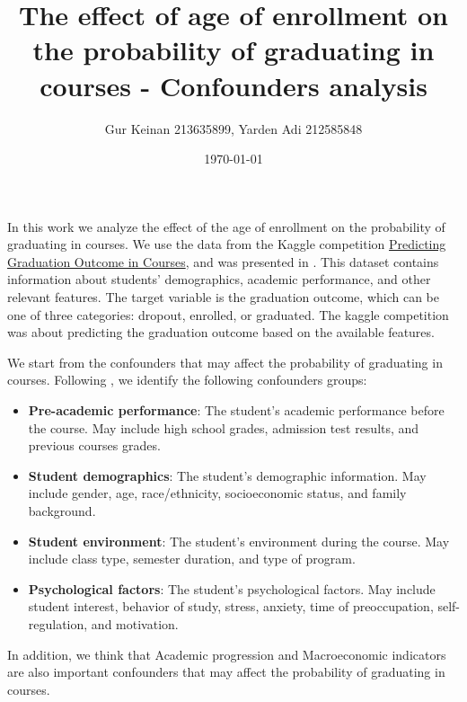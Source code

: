 \documentclass[12pt]{article}
\title{The effect of age of enrollment on the probability of graduating in courses - Confounders analysis}
\author{Gur Keinan 213635899, Yarden Adi 212585848}
\date{\today}
\begin{document}
\maketitle

In this work we analyze the effect of the age of enrollment on the probability of graduating in courses. We use the data from the Kaggle competition \href{https://www.kaggle.com/c/2020-ml-final-project}{Predicting Graduation Outcome in Courses}, and was presented in \citet{realinho2021predict}. This dataset contains information about students' demographics, academic performance, and other relevant features. The target variable is the graduation outcome, which can be one of three categories: dropout, enrolled, or graduated. The kaggle competition was about predicting the graduation outcome based on the available features.


We start from the confounders that may affect the probability of graduating in courses.
Following \citet{alyahyan2020predicting}, we identify the following confounders groups:
\begin{itemize}
    \item \textbf{Pre-academic performance}: The student's academic performance before the course. May include high school grades, admission test results, and previous courses grades.
    \item \textbf{Student demographics}: The student's demographic information. May include gender, age, race/ethnicity, socioeconomic status, and family background.
    \item \textbf{Student environment}: The student's environment during the course. May include class type, semester duration, and type of program.
    \item \textbf{Psychological factors}: The student's psychological factors. May include student interest, behavior of study, stress, anxiety, time of preoccupation, self-regulation, and motivation.
\end{itemize}

In addition, we think that Academic progression and Macroeconomic indicators are also important confounders that may affect the probability of graduating in courses.
\end{document}
